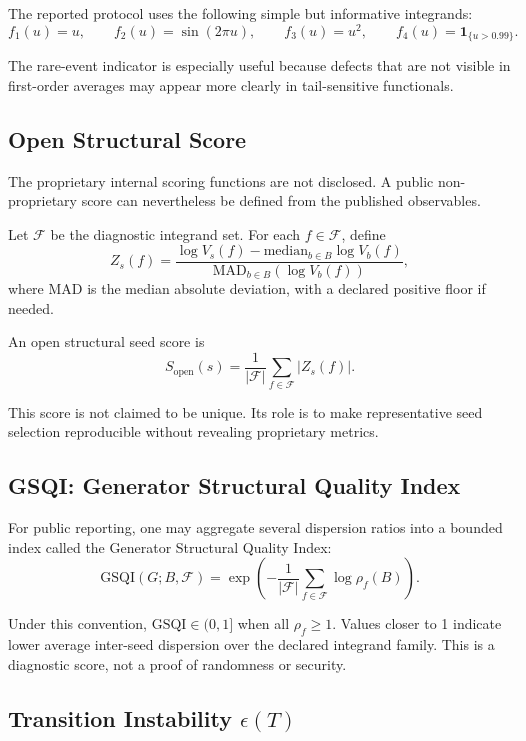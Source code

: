 \documentclass[11pt,a4paper]{article}
\begin{document}
The reported protocol uses the following simple but informative integrands:
\[
f_1(u)=u,\qquad
f_2(u)=\sin(2\pi u),\qquad
f_3(u)=u^2,\qquad
f_4(u)=\mathbf{1}_{\{u>0.99\}}.
\]

The rare-event indicator is especially useful because defects that are not visible in first-order averages may appear more clearly in tail-sensitive functionals.

\subsection{Open Structural Score}

The proprietary internal scoring functions are not disclosed. A public non-proprietary score can nevertheless be defined from the published observables.

Let $\mathcal{F}$ be the diagnostic integrand set. For each $f\in\mathcal{F}$, define
\[
Z_s(f)
 =
 \frac{\log V_s(f) - \mathrm{median}_{b\in B}\log V_b(f)}
      {\mathrm{MAD}_{b\in B}(\log V_b(f))},
\]
where MAD is the median absolute deviation, with a declared positive floor if needed.

An open structural seed score is
\[
S_{\mathrm{open}}(s)
  =
  \frac{1}{|\mathcal{F}|}
  \sum_{f\in\mathcal{F}} |Z_s(f)|.
\]

This score is not claimed to be unique. Its role is to make representative seed selection reproducible without revealing proprietary metrics.

\subsection{GSQI: Generator Structural Quality Index}

For public reporting, one may aggregate several dispersion ratios into a bounded index called the Generator Structural Quality Index:
\[
\mathrm{GSQI}(G;B,\mathcal{F})
  =
  \exp\left(
    -\frac{1}{|\mathcal{F}|}
    \sum_{f\in\mathcal{F}}
    \log \rho_f(B)
  \right).
\]

Under this convention, $\mathrm{GSQI}\in(0,1]$ when all $\rho_f\ge 1$. Values closer to 1 indicate lower average inter-seed dispersion over the declared integrand family. This is a diagnostic score, not a proof of randomness or security.

\subsection{\texorpdfstring{Transition Instability $\epsilon(T)$}{Transition Instability epsilon(T)}}
\end{document}
